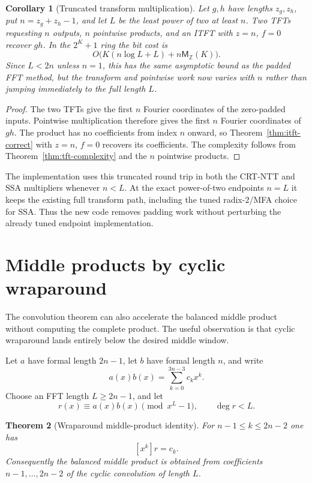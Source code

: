 \documentclass[11pt]{book}
\newtheorem{theorem}{Theorem}[section]
\newtheorem{corollary}[theorem]{Corollary}
\theoremstyle{definition}
\newcommand{\ZZ}{\mathbb Z}
\newcommand{\MZ}{\mathsf M_{\ZZ}}
\begin{document}
\begin{corollary}[Truncated transform multiplication]
\label{cor:tft-multiplication}
Let $g,h$ have lengths $z_g,z_h$, put $n=z_g+z_h-1$, and let $L$ be the least
power of two at least $n$.  Two TFTs requesting $n$ outputs, $n$ pointwise
products, and an ITFT with $z=n$, $f=0$ recover $gh$.  In the $2^K+1$ ring the
bit cost is
\[
 O\bigl(K(n\log L+L)+n\MZ(K)\bigr).
\]
Since $L<2n$ unless $n=1$, this has the same asymptotic bound as the padded
FFT method, but the transform and pointwise work now varies with $n$ rather
than jumping immediately to the full length $L$.
\end{corollary}

\begin{proof}
The two TFTs give the first $n$ Fourier coordinates of the zero-padded inputs.
Pointwise multiplication therefore gives the first $n$ Fourier coordinates of
$gh$.  The product has no coefficients from index $n$ onward, so
Theorem~\ref{thm:itft-correct} with $z=n$, $f=0$ recovers its coefficients.
The complexity follows from Theorem~\ref{thm:tft-complexity} and the $n$
pointwise products.
\end{proof}

The implementation uses this truncated round trip in both the CRT-NTT and SSA
multipliers whenever $n<L$.  At the exact power-of-two endpoints $n=L$ it
keeps the existing full transform path, including the tuned radix-$2$/MFA
choice for SSA.  Thus the new code removes padding work without perturbing the
already tuned endpoint implementation.

\section{Middle products by cyclic wraparound}
\label{sec:fft-middle-wrap}

The convolution theorem can also accelerate the balanced middle product without
computing the complete product.  The useful observation is that cyclic
wraparound lands entirely below the desired middle window.

Let $a$ have formal length $2n-1$, let $b$ have formal length $n$, and write
\[
 a(x)b(x)=\sum_{k=0}^{3n-3}c_kx^k.
\]
Choose an FFT length $L\geq2n-1$, and let
\[
 r(x)\equiv a(x)b(x)\pmod{x^L-1},\qquad \deg r<L.
\]

\begin{theorem}[Wraparound middle-product identity]
\label{thm:fft-middle-wrap}
For $n-1\leq k\leq2n-2$ one has
\[
 [x^k]r=c_k.
\]
Consequently the balanced middle product is obtained from coefficients
$n-1,\ldots,2n-2$ of the cyclic convolution of length $L$.
\end{theorem}
\end{document}
